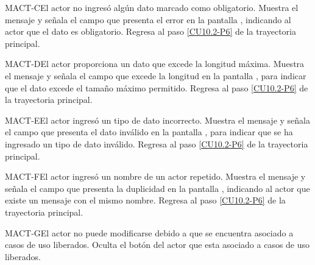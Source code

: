 	\begin{UCtrayectoriaA}{MACT-C}{El actor no ingresó algún dato marcado como obligatorio.}
		\UCpaso[\UCsist] Muestra el mensaje  y señala el campo que presenta el error en la pantalla , indicando al actor que el dato es obligatorio.
		\UCpaso Regresa al paso \ref{CU10.2-P6} de la trayectoria principal.
	\end{UCtrayectoriaA}

	\begin{UCtrayectoriaA}{MACT-D}{El actor proporciona un dato que excede la longitud máxima.}
		\UCpaso[\UCsist] Muestra el mensaje  y señala el campo que excede la longitud en la pantalla , para indicar que el dato excede el tamaño máximo permitido.
		\UCpaso Regresa al paso \ref{CU10.2-P6} de la trayectoria principal.
	\end{UCtrayectoriaA}

	\begin{UCtrayectoriaA}{MACT-E}{El actor ingresó un tipo de dato incorrecto.}
		\UCpaso[\UCsist] Muestra el mensaje  y señala el campo que presenta el dato inválido en la pantalla , para indicar que se ha ingresado un tipo de dato inválido.
		\UCpaso Regresa al paso \ref{CU10.2-P6} de la trayectoria principal.
	\end{UCtrayectoriaA}
	
	\begin{UCtrayectoriaA}{MACT-F}{El actor ingresó un nombre de un actor repetido.}
		\UCpaso[\UCsist] Muestra el mensaje  y señala el campo que presenta la duplicidad en la pantalla , indicando al actor que existe un mensaje con el mismo nombre.
		\UCpaso Regresa al paso \ref{CU10.2-P6} de la trayectoria principal.
	\end{UCtrayectoriaA}

	\begin{UCtrayectoriaA}{MACT-G}{El actor no puede modificarse debido a que se encuentra asociado a casos de uso liberados.}
		\UCpaso[\UCsist] Oculta el botón \editar del actor que esta asociado a casos de uso liberados.
	\end{UCtrayectoriaA}
